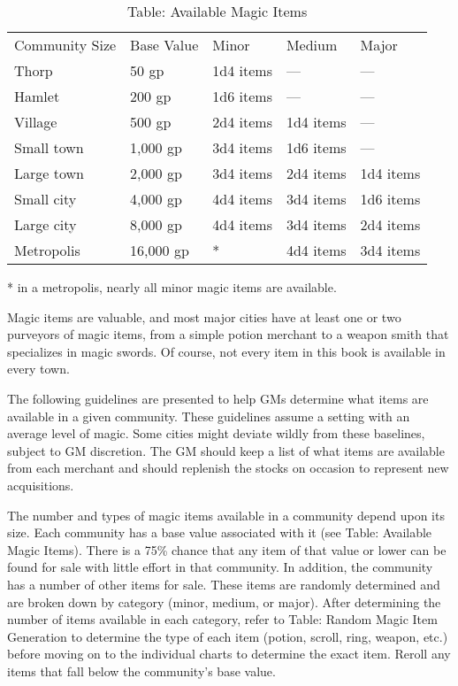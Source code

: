 \begin{table}[]
\sffamily
\caption{Table: Available Magic Items}
\begin{tabular}{lllll}
Community Size & Base Value & Minor & Medium & Major\\
Thorp & 50 gp & 1d4 items & — & — \\
 Hamlet & 200 gp & 1d6 items & — & — \\
 Village & 500 gp & 2d4 items & 1d4 items & — \\
 Small town & 1,000 gp & 3d4 items & 1d6 items & — \\
 Large town & 2,000 gp & 3d4 items & 2d4 items & 1d4 items \\
 Small city & 4,000 gp & 4d4 items & 3d4 items & 1d6 items \\
 Large city & 8,000 gp & 4d4 items & 3d4 items & 2d4 items \\
 Metropolis & 16,000 gp & * & 4d4 items & 3d4 items\\

\end{tabular}
* in a metropolis, nearly all minor magic items are available.\\
\end{table}

				
Magic items are valuable, and most major cities have at least one or two purveyors of magic items, from a simple potion merchant to a weapon smith that specializes in magic swords. Of course, not every item in this book is available in every town. 
				
The following guidelines are presented to help GMs determine what items are available in a given community. These guidelines assume a setting with an average level of magic. Some cities might deviate wildly from these baselines, subject to GM discretion. The GM should keep a list of what items are available from each merchant and should replenish the stocks on occasion to represent new acquisitions.
				
The number and types of magic items available in a community depend upon its size. Each community has a base value associated with it (see Table: Available Magic Items). There is a 75\% chance that any item of that value or lower can be found for sale with little effort in that community. In addition, the community has a number of other items for sale. These items are randomly determined and are broken down by category (minor, medium, or major). After determining the number of items available in each category, refer to Table: Random Magic Item Generation to determine the type of each item (potion, scroll, ring, weapon, etc.) before moving on to the individual charts to determine the exact item. Reroll any items that fall below the community's base value.
				
